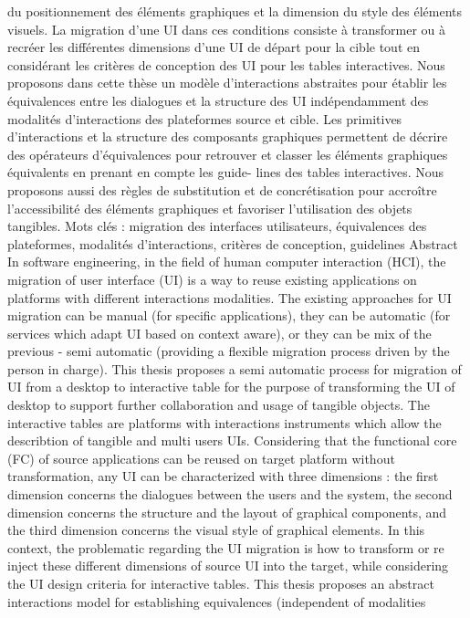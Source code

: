 \documentclass{article}
\begin{document}
du positionnement des éléments graphiques et la dimension du style des éléments visuels. La migration d’une
UI dans ces conditions consiste à transformer ou à recréer les différentes dimensions d’une UI de départ pour
la cible tout en considérant les critères de conception des UI pour les tables interactives.
Nous proposons dans cette thèse un modèle d’interactions abstraites pour établir les équivalences entre les
dialogues et la structure des UI indépendamment des modalités d’interactions des plateformes source et cible.
Les primitives d’interactions et la structure des composants graphiques permettent de décrire des opérateurs
d’équivalences pour retrouver et classer les éléments graphiques équivalents en prenant en compte les guide-
lines des tables interactives. Nous proposons aussi des règles de substitution et de concrétisation pour accroître
l’accessibilité des éléments graphiques et favoriser l’utilisation des objets tangibles.
Mots clés :
migration des interfaces utilisateurs, équivalences des plateformes, modalités d’interactions,
critères de conception, guidelines
Abstract
In software engineering, in the ﬁeld of human computer interaction (HCI), the migration of user interface
(UI) is a way to reuse existing applications on platforms with different interactions modalities. The existing
approaches for UI migration can be manual (for speciﬁc applications), they can be automatic (for services
which adapt UI based on context aware), or they can be mix of the previous - semi automatic (providing a
ﬂexible migration process driven by the person in charge).
This thesis proposes a semi automatic process for migration of UI from a desktop to interactive table for the
purpose of transforming the UI of desktop to support further collaboration and usage of tangible objects. The
interactive tables are platforms with interactions instruments which allow the describtion of tangible and multi
users UIs. Considering that the functional core (FC) of source applications can be reused on target platform
without transformation, any UI can be characterized with three dimensions : the ﬁrst dimension concerns the
dialogues between the users and the system, the second dimension concerns the structure and the layout of
graphical components, and the third dimension concerns the visual style of graphical elements. In this context,
the problematic regarding the UI migration is how to transform or re inject these different dimensions of source
UI into the target, while considering the UI design criteria for interactive tables.
This thesis proposes an abstract interactions model for establishing equivalences (independent of modalities
\end{document}

